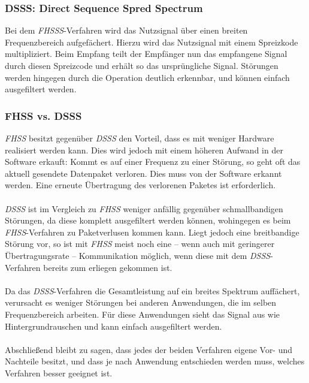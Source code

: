         \subsubsection{DSSS: Direct Sequence Spred Spectrum}\label{DSSS}
            Bei dem \textsl{FHSSS}-Verfahren wird das Nutzsignal über einen breiten Frequenzbereich
            aufgefächert. Hierzu wird das Nutzsignal mit einem Spreizkode multipliziert. 
            Beim Empfang teilt der Empfänger nun das empfangene Signal durch diesen Spreizcode
            und erhält so das ursprüngliche Signal. Störungen werden hingegen durch die 
            Operation deutlich erkennbar, und können einfach ausgefiltert werden.
        \subsubsection{FHSS vs. DSSS}\label{FHSSvsDSSS}
            \textsl{FHSS} besitzt gegenüber \textsl{DSSS} den Vorteil, dass es mit weniger Hardware
            realisiert werden kann. 
            Dies wird jedoch mit einem höheren Aufwand in der Software erkauft: Kommt es auf einer
            Frequenz zu einer Störung, so geht oft das aktuell gesendete Datenpaket verloren.
            Dies muss von der Software erkannt werden. Eine erneute Übertragung des verlorenen
            Paketes ist erforderlich.\\
            \\
            \textsl{DSSS} ist im Vergleich zu \textsl{FHSS} weniger anfällig gegenüber
            schmallbandigen Störungen, da diese komplett ausgefiltert werden können, 
            wohingegen es beim \textsl{FHSS}-Verfahren zu Paketverlusen kommen kann.
            Liegt jedoch eine breitbandige Störung vor, so ist mit \textsl{FHSS}
            meist noch eine -- wenn auch mit geringerer Übertragungsrate -- Kommunikation
            möglich, wenn diese mit dem \textsl{DSSS}-Verfahren bereits zum erliegen gekommen ist.\\
            \\
            Da das \textsl{DSSS}-Verfahren die Gesamtleistung auf ein breites Spektrum auffächert,
            verursacht es weniger Störungen bei anderen Anwendungen, die im selben Frequenzbereich
            arbeiten. Für diese Anwendungen sieht das Signal aus wie Hintergrundrauschen und kann
            einfach ausgefiltert werden.\\
            \\
            Abschließend bleibt zu sagen, dass jedes der beiden Verfahren eigene Vor- und Nachteile
            besitzt, und dass je nach Anwendung entschieden werden muss, welches Verfahren
            besser geeignet ist.
            

